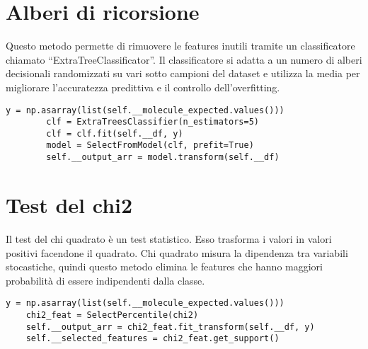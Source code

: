 \section{Alberi di ricorsione}\label{sec:alberi-di-ricorsione}
Questo metodo permette di rimuovere le features inutili tramite un classificatore chiamato ``ExtraTreeClassificator''.
Il classificatore si adatta a un numero di alberi decisionali randomizzati su vari sotto campioni del dataset e utilizza la media
per migliorare l'accuratezza predittiva e il controllo dell'overfitting.
\begin{lstlisting}[label={lst:tree}]
    y = np.asarray(list(self.__molecule_expected.values()))
        clf = ExtraTreesClassifier(n_estimators=5)
        clf = clf.fit(self.__df, y)
        model = SelectFromModel(clf, prefit=True)
        self.__output_arr = model.transform(self.__df)
\end{lstlisting}

\section{Test del chi2}\label{sec:test-del-chi2}
Il test del chi quadrato \`e un test statistico.
Esso trasforma i valori in valori positivi facendone il quadrato.
Chi quadrato misura la dipendenza tra variabili stocastiche, quindi questo metodo elimina le features
che hanno maggiori probabilit\`a di essere indipendenti dalla classe.
\begin{lstlisting}[label={lst:chi2_impl}]
    y = np.asarray(list(self.__molecule_expected.values()))
    chi2_feat = SelectPercentile(chi2)
    self.__output_arr = chi2_feat.fit_transform(self.__df, y)
    self.__selected_features = chi2_feat.get_support()
\end{lstlisting}


